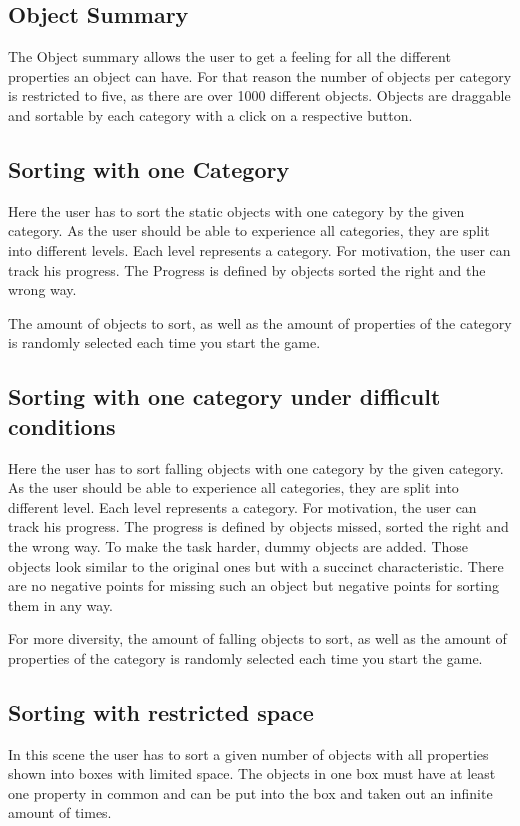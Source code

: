 \subsection{Object Summary}\label{subsec:object-summary}
The Object summary allows the user to get a feeling for all the different properties an object can have.
For that reason the number of objects per category is restricted to five, as there are over 1000 different objects.
Objects are draggable and sortable by each category with a click on a respective button.

\subsection{Sorting with one Category}\label{subsec:sorting-with-one-category}
Here the user has to sort the static objects with one category by the given category.
As the user should be able to experience all categories, they are split into different levels.
Each level represents a category.
For motivation, the user can track his progress.
The Progress is defined by objects sorted the right and the wrong way.

The amount of objects to sort, as well as the amount of properties of the category
is randomly selected each time you start the game.

\subsection{Sorting with one category under difficult conditions}\label{subsec:sorting-with-one-category-under-difficult-conditions}
Here the user has to sort falling objects with one category by the given category.
As the user should be able to experience all categories, they are split into different level.
Each level represents a category.
For motivation, the user can track his progress.
The progress is defined by objects missed, sorted the right and the wrong way.
To make the task harder, dummy objects are added.
Those objects look similar to the original ones but with a succinct characteristic.
There are no negative points for missing such an object but negative points for sorting them in any way.

For more diversity, the amount of falling objects to sort, as well as the amount of properties of the category
is randomly selected each time you start the game.

\subsection{Sorting with restricted space}\label{subsec:sorting-with-restricted-space}
In this scene the user has to sort a given number of objects with all properties shown into boxes with limited space.
The objects in one box must have at least one property in common and
can be put into the box and taken out an infinite amount of times.

